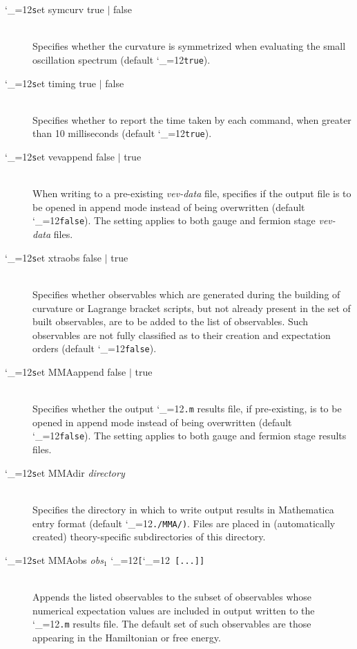 \documentclass [12pt]{article}
\makeatletter
\renewcommand{\tt}{\begingroup\catcode`_=12\def\_{\string_}\tt@}
\newcommand{\tt@}[1]{\texttt{#1}\endgroup}
\makeatother
\begin{document}
\begin{description}
\item [\tt set symcurv true $\vert$ false]~\\
    Specifies whether the curvature is
    symmetrized when evaluating the
    small oscillation spectrum
    (default \tt{true}).

\item [\tt set timing true $\vert$ false]~\\
    Specifies whether to report the time taken by each command,
    when greater than 10 milliseconds
    (default \tt{true}).

\item [\tt set vevappend false $\vert$ true]~\\
    When writing to a pre-existing \textit{vev-data} file,
    specifies if the output file is to be opened in append mode
    instead of being overwritten
    (default \tt{false}).  The setting applies to both
    gauge and fermion stage \textit{vev-data} files.

\item [\tt set xtraobs false $\vert$ true]~\\
    Specifies whether observables which are generated
    during the building of curvature or Lagrange bracket scripts,
    but not already present in the set of built observables,
    are to be added to the list of observables.
    Such observables are not fully classified as to their
    creation and expectation orders
    (default \tt{false}).

\item [\tt set MMAappend false $\vert$ true]~\\
    Specifies whether the output \tt{.m} results file,
    if pre-existing, is to be opened in append mode
    instead of being overwritten
    (default \tt{false}).  The setting applies to both
    gauge and fermion stage results files.

\item [\tt set MMAdir {\it directory}]~\\
    Specifies the directory in which to
    write output results in Mathematica entry format
    (default \tt{./MMA/)}.
    Files are placed in (automatically created)
    theory-specific subdirectories of this directory.

\item [\tt set MMAobs {\it obs$_1$} \tt{[}{\it obs$_2$}\tt{ [...]]}]~\\
    Appends the listed observables to the subset of observables whose
    numerical expectation values are included in output written
    to the \tt{.m} results file.
    The default set of such observables are those appearing
    in the Hamiltonian or free energy.


\end{description}
\end{document}
